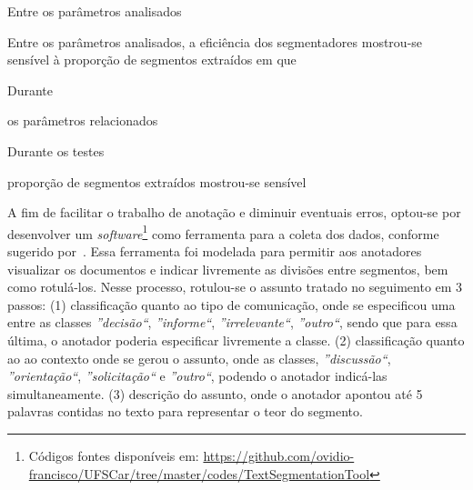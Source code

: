Entre os parâmetros analisados

Entre os parâmetros analisados, a eficiência dos segmentadores mostrou-se sensível à proporção de segmentos extraídos em que 

Durante








os parâmetros relacionados 



Durante os testes 



proporção de segmentos extraídos mostrou-se sensível































A fim de facilitar o trabalho de anotação e diminuir eventuais erros, optou-se por desenvolver um \textit{software}\footnote{Códigos fontes disponíveis em: \url{https://github.com/ovidio-francisco/UFSCar/tree/master/codes/TextSegmentationTool} } como ferramenta para a coleta dos dados, conforme sugerido por~\cite{Hovy2010}. Essa ferramenta foi modelada para permitir aos anotadores visualizar os documentos e indicar livremente as divisões entre segmentos, bem como rotulá-los. 
Nesse processo, rotulou-se o assunto tratado no seguimento em 3 passos:
(1) classificação quanto ao tipo de comunicação, onde se especificou uma entre as classes 
\textit{''decisão``},
\textit{''informe``},
\textit{''irrelevante``},
\textit{''outro``}, sendo que para essa última, o anotador poderia especificar livremente a classe.
(2) classificação quanto ao ao contexto onde se gerou o assunto, onde as classes, 
\textit{''discussão``},
\textit{''orientação``},
\textit{''solicitação``} e
\textit{''outro``}, podendo o anotador indicá-las simultaneamente.
(3) descrição do assunto, onde o anotador apontou até 5 palavras contidas no texto para representar o teor do segmento.


